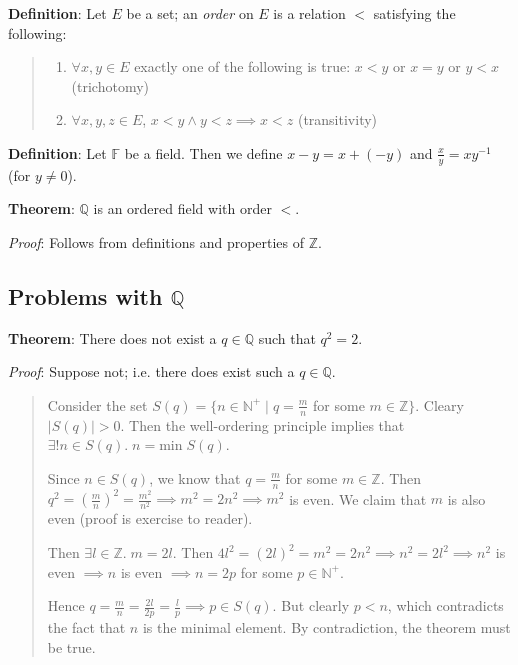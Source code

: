 \documentclass[11pt]{article}
\begin{document}
\textbf{Definition}: Let $E$ be a set; an \emph{order} on $E$ is a relation $<$ satisfying the following:
\begin{quote}\vspace{-0.3cm}
	\begin{enumerate}
	\item $\forall x,y \in E$ exactly one of the following is true: $x < y$ or $x = y$ or $y < x$ (trichotomy)
	\item $\forall x,y,z \in E$, $x < y \land y < z \implies x < z$ (transitivity)
	\end{enumerate}
\end{quote}

\textbf{Definition}: Let $\mathbb{F}$ be a field. Then we define $x - y = x + (-y)$ and $\frac{x}{y} = xy^{-1}$ (for $y \neq 0$).

\textbf{Theorem}: $\mathbb{Q}$ is an ordered field with order $<$.

\emph{Proof}: Follows from definitions and properties of $\mathbb{Z}$.


\subsection{Problems with $\mathbb{Q}$}

\textbf{Theorem}: There does not exist a $q \in \mathbb{Q}$ such that $q^2 = 2$.

\emph{Proof}: Suppose not; i.e. there does exist such a $q \in \mathbb{Q}$.
\begin{quote}\vspace{-0.3cm}
Consider the set $S(q) = \{n \in \mathbb{N}^+ \;|\; q = \frac{m}{n}$ for some $m \in \mathbb{Z}\}$. Cleary $|S(q)| > 0$. Then the well-ordering principle implies that $\exists !n \in S(q).\; n = \text{min}\; S(q)$.

Since $n \in S(q)$, we know that $q = \frac{m}{n}$ for some $m \in \mathbb{Z}$. Then $q^2 = (\frac{m}{n})^2 = \frac{m^2}{n^2} \implies m^2 = 2n^2 \implies m^2$ is even. We claim that $m$ is also even (proof is exercise to reader).

Then $\exists l \in \mathbb{Z}.\; m = 2l$. Then $4l^2 = (2l)^2 = m^2 = 2n^2 \implies n^2 = 2l^2 \implies n^2$ is even $\implies n$ is even $\implies n = 2p$ for some $p \in \mathbb{N}^+$.

Hence $q = \frac{m}{n} = \frac{2l}{2p} = \frac{l}{p} \implies p \in S(q)$. But clearly $p < n$, which contradicts the fact that $n$ is the minimal element. By contradiction, the theorem must be true.
\end{quote}
\end{document}
